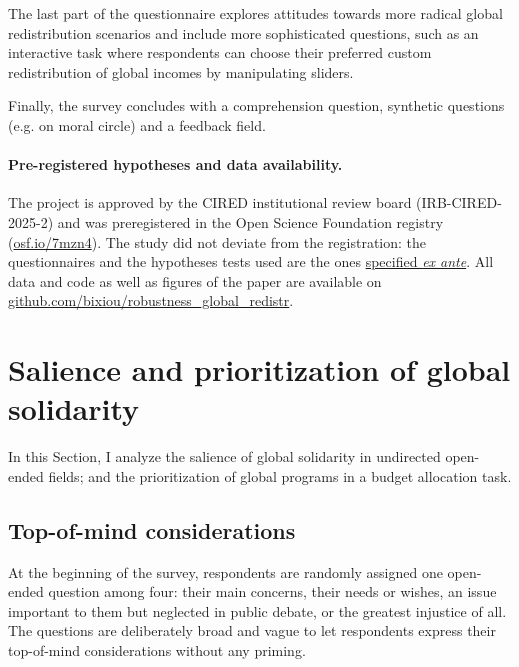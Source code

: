 \documentclass[12pt,english]{article}
\begin{document}
\begin{bibunit}
The last part of the questionnaire explores attitudes towards more radical global redistribution scenarios and include more sophisticated questions, such as an interactive task where respondents can choose their preferred custom redistribution of global incomes by manipulating sliders. 

Finally, the survey concludes with a comprehension question, synthetic questions (e.g. on moral circle) and a feedback field.

\paragraph{Pre-registered hypotheses and data availability.}
The project is approved by the CIRED institutional review board (IRB-CIRED-2025-2) and %
was preregistered in the Open Science Foundation registry (\href{https://osf.io/7mzn4}{osf.io/7mzn4}). The study did not deviate from the registration: the questionnaires and the hypotheses tests used are the ones \href{https://osf.io/j5scn}{specified \textit{ex ante}}. All data and code as well as figures of the paper are available on \href{https://github.com/bixiou/robustness_global_redistr}{github.com/bixiou/robustness\_global\_redistr}. 


\section{Salience and prioritization of global solidarity\label{sec:salience}}
In this Section, I analyze the salience of global solidarity in undirected open-ended fields; and the prioritization of global programs in a budget allocation task.

\subsection{Top-of-mind considerations}\label{subsec:considerations}

At the beginning of the survey, respondents are randomly assigned one open-ended question among four: their main concerns, their needs or wishes, an issue important to them but neglected in public debate, or the greatest injustice of all. The questions are deliberately broad and vague to let respondents express their top-of-mind considerations without any priming. 


\end{bibunit}
\end{document}
